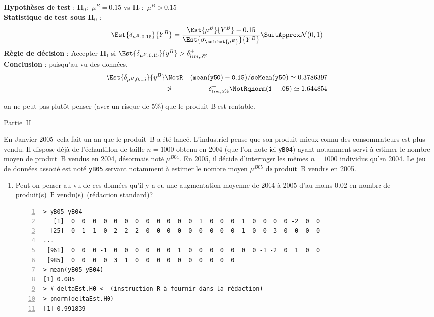 \documentclass[10pt]{report}
\begin{document}
\begin{exercice}
\begin{enumerate}
\begin{Correction}
\noindent \textbf{Hypothèses de test} : $\mathbf{H}_0:$ $\mu^{B}=0.15$ vs {\large $\mathbf{H}_1:$ $\mu^{B}>0.15$}\\
\textbf{Statistique de test sous $\mathbf{H}_0$} :
  $$
  \Est{\delta_{\mu^{B},0.15}}{Y^{B}}= {\displaystyle \frac{\Est{\mu^{B}}{Y^{B}}-0.15}{
\Est{\sigma_{\cqlshat{\mu^{B}}}}{Y^{B}}
}} 
  \SuitApprox \mathcal{N}(0,1)
  $$
\textbf{Règle de décision} : Accepter $\mathbf{H}_1$ si 
  $\Est{\delta_{\mu^{B},0.15}}{y^{B}} > \delta^+_{lim,5\%}$\\
\noindent \textbf{Conclusion} :
puisqu'au vu des données, 
  \begin{eqnarray*}
\Est{\delta_{\mu^{B},0.15}}{y^{B}} &\NotR&\mathtt{(mean(y50)-0.15)/seMean(y50)}\simeq 0.3786397\\&\ngtr & \delta^+_{lim,5\%} \NotR \mathtt{qnorm(1-.05)}\simeq1.644854
\end{eqnarray*}
  
on ne peut pas plutôt penser (avec un risque de 5\%) que le produit B est rentable.
\end{Correction}






\end{enumerate}

\noindent \underline{Partie~II}

En Janvier 2005, cela fait un an que le produit~B a été lancé. L'industriel pense que son produit mieux connu des consommateurs est plus vendu. Il dispose déjà de l'échantillon de taille $n=1000$ obtenu en 2004 (que l'on note ici \texttt{yB04}) ayant notamment servi à estimer le nombre moyen de produit~B vendus en 2004, désormais noté $\mu^{B04}$. En 2005, il décide d'interroger les mêmes $n=1000$ individus qu'en 2004. Le jeu de données associé est noté \texttt{yB05} servant notamment  à estimer le nombre moyen $\mu^{B05}$ de produit~B vendus en 2005.

\begin{enumerate}
\item Peut-on penser au vu de ces données qu'il y a eu une augmentation moyenne de 2004 à 2005 d'au moins $0.02$ en nombre de produit(s)~B vendu(s)~(rédaction standard)? 

\IndicR
\begin{Verbatim}[frame=leftline,fontfamily=tt,fontshape=n,numbers=left]
> yB05-yB04
   [1]  0  0  0  0  0  0  0  0  0  0  0  0  1  0  0  0  1  0  0  0  0 -2  0  0
  [25]  0  1  1  0 -2 -2 -2  0  0  0  0  0  0  0  0  0 -1  0  0  3  0  0  0  0
...
 [961]  0  0  0 -1  0  0  0  0  0  0  1  0  0  0  0  0  0  0 -1 -2  0  1  0  0
 [985]  0  0  0  0  3  1  0  0  0  0  0  0  0  0  0  0
> mean(yB05-yB04)
[1] 0.085
> # deltaEst.H0 <- (instruction R à fournir dans la rédaction)
> pnorm(deltaEst.H0)
[1] 0.991839
\end{Verbatim}


\end{enumerate}
\end{exercice}
\end{document}
